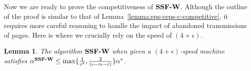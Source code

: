 \documentclass[11pt]{article}
\newtheorem{lemma}{Lemma}[section]
\newcommand{\lemref}[1]{Lemma~\ref{lemma:#1}}
\newcommand{\lemlab}[1]{\label{lemma:#1}}
\newcommand{\eps}{\epsilon}
\newcommand{\st}{S} \newcommand{\Algorithm}[1]{{\texttt{\bf{#1}}}} \newcommand{\sbg}{\Algorithm{SSF-W}} \newcommand{\sug}{\Algorithm{SSF}} \newcommand{\mmug}{\Algorithm{SSF-ID}}
\begin{document}
\iffalse
\begin{proof}
  For sake of contradiction, assume that a request $J_{(x,j)}$
  scheduled by $\sbg$ on the interval $I$ has arrival time less than
  $a_{(p,k)} - (1-c)(f_{(p,k)} - a_{(p,k)})$. Since $\sbg$ has not finished
  this request by $t'$, $f_{(x,j)} \ge a_{(p,k)} + c(f_{(p,k)} - a_{(p,k)})$.
  Also, as we observed before, all requests scheduled during $I$ by
  $\sbg$ have slack no more than that of $J_{(p,k)}$ which implies
  that $\st_{(x,j)} \le \st_{(p,k)}$. However, this implies that
  the delay factor of $J_{(x,j)}$ is at least
    \begin{eqnarray*}
      \frac{(f_{(x,j)} - a_{(x,j)})}{\st_{(x,j)}} & \ge & \frac{a_{(p,k)} + c(f_{(p,k)} - a_{(p,k)}) - (a_{(p,k)} - (1-c)(f_{(p,k)} - a_{(p,k)}))}{\st_{(x,j)}} \\
        & \ge & \frac{(f_{(p,k)} - a_{(p,k)})}{\st_{(x,j)}} \\
        & \ge & \frac{(f_{(p,k)} - a_{(p,k)})}{\st_{(p,k)}} ~ \ge ~ \alpha^{\sbg}.
      \end{eqnarray*}

      This is a contradiction to the fact that $J_{(p,k)}$ is the
      first request that witnessed the maximum delay factor of \sbg.
\end{proof}

\fi


Now we are ready to prove the competitiveness of $\sbg$.
Although the outline of the proof is similar to that of
\lemref{eps-ceps-c-competitive}, it requires more careful reasoning
to handle the impact of abandoned transmissions
of pages. Here is where we crucially rely on the speed of $(4+\eps)$.

\begin{lemma}
  \lemlab{eps-ceps-c-competitivevarying}
  The algorithm $\sbg$ when given a $(4+\eps)$-speed machine
  satisfies $\alpha^{\sbg} \le \max\{\frac{1}{c^2}, \frac{2}{(\eps - c\eps - c)}\} \alpha^*$.
\end{lemma}
\end{document}
